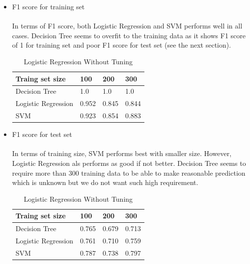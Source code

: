\documentclass{article}
\begin{document}
\begin{itemize}
\begin{itemize}
\item F1 score for training set
\\\\
In terms of F1 score, both Logistic Regression and SVM performs well in all cases.  Decision Tree seems to overfit to the training data as it shows F1 score of 1 for training set and poor F1 score for test set (see the next section).  
\\
\begin{table}[H]
\centering
\begin{tabular}{| l | l | l | l |}
\hline
Traing set size           & 100 & 200 & 300 \\
\hline
Decision Tree             & 1.0  & 1.0   & 1.0  \\
\hline
Logistic Regression       & 0.952 & 0.845 & 0.844 \\
\hline
SVM                       & 0.923 & 0.854 & 0.883 \\
\hline      
\end{tabular}
\caption{Logistic Regression Without Tuning}
\end{table}

\item F1 score for test set
\\\\
In terms of training size, SVM performs best with smaller size.  However, Logistic Regression als performs as good if not better.  Decision Tree seems to require more than 300 training data to be able to make reasonable prediction which is unknown but we do not want such high requirement.  
\\
\begin{table}[H]
\centering
\begin{tabular}{| l | l | l | l |}
\hline
Traing set size           & 100  &  200  &  300 \\
\hline
Decision Tree            & 0.765 & 0.679 & 0.713 \\
\hline
Logistic Regression       & 0.761 & 0.710 & 0.759 \\
\hline
SVM                       & 0.787 & 0.738 & 0.797 \\
\hline      
\end{tabular}
\caption{Logistic Regression Without Tuning}
\end{table}


\end{itemize}
\end{itemize}
\end{document}
